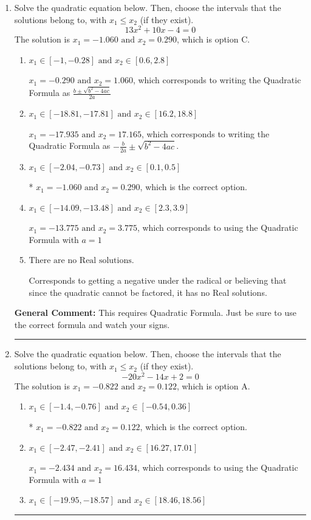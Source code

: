 \documentclass{extbook}[14pt]
\newcommand{\litem}[1]{\item #1

\rule{\textwidth}{0.4pt}}
\begin{document}
\begin{enumerate}\litem{
Solve the quadratic equation below. Then, choose the intervals that the solutions belong to, with $x_1 \leq x_2$ (if they exist).
\[ 13x^{2} +10 x -4 = 0 \]The solution is \( x_1 = -1.060 \text{ and } x_2 = 0.290 \), which is option C.\begin{enumerate}[label=\Alph*.]
\item \( x_1 \in [-1, -0.28] \text{ and } x_2 \in [0.6, 2.8] \)

 $x_1 = -0.290 \text{ and } x_2 = 1.060$, which corresponds to writing the Quadratic Formula as $\frac{b \pm \sqrt{b^2 - 4ac}}{2a}$
\item \( x_1 \in [-18.81, -17.81] \text{ and } x_2 \in [16.2, 18.8] \)

 $x_1 = -17.935 \text{ and } x_2 = 17.165$, which corresponds to writing the Quadratic Formula as $-\frac{b}{2a} \pm \sqrt{b^2 - 4ac}$.
\item \( x_1 \in [-2.04, -0.73] \text{ and } x_2 \in [0.1, 0.5] \)

* $x_1 = -1.060 \text{ and } x_2 = 0.290$, which is the correct option.
\item \( x_1 \in [-14.09, -13.48] \text{ and } x_2 \in [2.3, 3.9] \)

 $x_1 = -13.775 \text{ and } x_2 = 3.775$, which corresponds to using the Quadratic Formula with $a=1$
\item \( \text{There are no Real solutions.} \)

Corresponds to getting a negative under the radical or believing that since the quadratic cannot be factored, it has no Real solutions.
\end{enumerate}

\textbf{General Comment:} This requires Quadratic Formula. Just be sure to use the correct formula and watch your signs.
}
\litem{
Solve the quadratic equation below. Then, choose the intervals that the solutions belong to, with $x_1 \leq x_2$ (if they exist).
\[ -20x^{2} -14 x + 2 = 0 \]The solution is \( x_1 = -0.822 \text{ and } x_2 = 0.122 \), which is option A.\begin{enumerate}[label=\Alph*.]
\item \( x_1 \in [-1.4, -0.76] \text{ and } x_2 \in [-0.54, 0.36] \)

* $x_1 = -0.822 \text{ and } x_2 = 0.122$, which is the correct option.
\item \( x_1 \in [-2.47, -2.41] \text{ and } x_2 \in [16.27, 17.01] \)

 $x_1 = -2.434 \text{ and } x_2 = 16.434$, which corresponds to using the Quadratic Formula with $a=1$
\item \( x_1 \in [-19.95, -18.57] \text{ and } x_2 \in [18.46, 18.56] \)


\end{enumerate}}
\end{enumerate}
\end{document}
